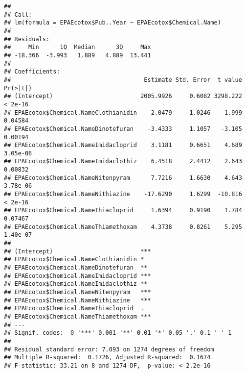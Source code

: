 \documentclass[]{article}
\newenvironment{Shaded}{\begin{snugshade}}{\end{snugshade}}
\newcommand{\KeywordTok}[1]{\textcolor[rgb]{0.13,0.29,0.53}{\textbf{#1}}}
\newcommand{\StringTok}[1]{\textcolor[rgb]{0.31,0.60,0.02}{#1}}
\newcommand{\CommentTok}[1]{\textcolor[rgb]{0.56,0.35,0.01}{\textit{#1}}}
\newcommand{\OperatorTok}[1]{\textcolor[rgb]{0.81,0.36,0.00}{\textbf{#1}}}
\newcommand{\NormalTok}[1]{#1}
\begin{document}
\begin{Shaded}
\end{Shaded}

\begin{verbatim}
## 
## Call:
## lm(formula = EPAEcotox$Pub..Year ~ EPAEcotox$Chemical.Name)
## 
## Residuals:
##     Min      1Q  Median      3Q     Max 
## -18.366  -3.993   1.889   4.889  13.441 
## 
## Coefficients:
##                                      Estimate Std. Error  t value Pr(>|t|)
## (Intercept)                         2005.9926     0.6082 3298.222  < 2e-16
## EPAEcotox$Chemical.NameClothianidin    2.0479     1.0246    1.999  0.04584
## EPAEcotox$Chemical.NameDinotefuran    -3.4333     1.1057   -3.105  0.00194
## EPAEcotox$Chemical.NameImidacloprid    3.1181     0.6651    4.689 3.05e-06
## EPAEcotox$Chemical.NameImidaclothiz    6.4518     2.4412    2.643  0.00832
## EPAEcotox$Chemical.NameNitenpyram      7.7216     1.6630    4.643 3.78e-06
## EPAEcotox$Chemical.NameNithiazine    -17.6290     1.6299  -10.816  < 2e-16
## EPAEcotox$Chemical.NameThiacloprid     1.6394     0.9190    1.784  0.07467
## EPAEcotox$Chemical.NameThiamethoxam    4.3738     0.8261    5.295 1.40e-07
##                                        
## (Intercept)                         ***
## EPAEcotox$Chemical.NameClothianidin *  
## EPAEcotox$Chemical.NameDinotefuran  ** 
## EPAEcotox$Chemical.NameImidacloprid ***
## EPAEcotox$Chemical.NameImidaclothiz ** 
## EPAEcotox$Chemical.NameNitenpyram   ***
## EPAEcotox$Chemical.NameNithiazine   ***
## EPAEcotox$Chemical.NameThiacloprid  .  
## EPAEcotox$Chemical.NameThiamethoxam ***
## ---
## Signif. codes:  0 '***' 0.001 '**' 0.01 '*' 0.05 '.' 0.1 ' ' 1
## 
## Residual standard error: 7.093 on 1274 degrees of freedom
## Multiple R-squared:  0.1726, Adjusted R-squared:  0.1674 
## F-statistic: 33.21 on 8 and 1274 DF,  p-value: < 2.2e-16
\end{verbatim}

\begin{Shaded}
\end{Shaded}
\end{document}
